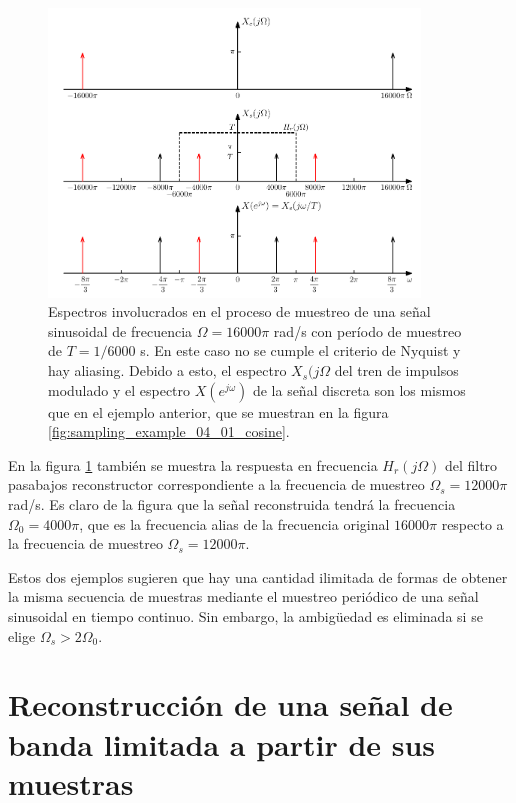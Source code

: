 \documentclass[a4paper]{report}
\begin{document}
\begin{figure}[!htb]
 \begin{center}
 \includegraphics[width=0.88\textwidth]{figuras/sampling_example_04_02_cosine_aliasing.pdf}
 \caption{\label{fig:sampling_example_04_02_cosine_aliasing} Espectros involucrados en el proceso de muestreo de una señal sinusoidal de frecuencia \(\Omega=16000\pi\) rad/s con período de muestreo de \(T=1/6000\) s. En este caso no se cumple el criterio de Nyquist y hay aliasing. Debido a esto, el espectro \(X_s(j\Omega\) del tren de impulsos modulado y el espectro \(X(e^{j\omega})\) de la señal discreta son los mismos que en el ejemplo anterior, que se muestran en la figura \ref{fig:sampling_example_04_01_cosine}.}
 \end{center}
\end{figure} 
En la figura \ref{fig:sampling_example_04_02_cosine_aliasing} también se muestra la respuesta en frecuencia \(H_r(j\Omega)\) del filtro pasabajos reconstructor correspondiente a la frecuencia de muestreo \(\Omega_s=12000\pi\) rad/s. Es claro de la figura que la señal reconstruida tendrá la frecuencia \(\Omega_0=4000\pi\), que es la frecuencia alias de la frecuencia original \(16000\pi\) respecto a la frecuencia de muestreo \(\Omega_s=12000\pi\).

Estos dos ejemplos sugieren que hay una cantidad ilimitada de formas de obtener la misma secuencia de muestras mediante el muestreo periódico de una señal sinusoidal en tiempo continuo. Sin embargo, la ambigüedad es eliminada si se elige \(\Omega_s>2\Omega_0\).


\section{Reconstrucción de una señal de banda limitada a partir de sus muestras}\label{sec:sampling_reconstruction_from_samples}
\end{document}
